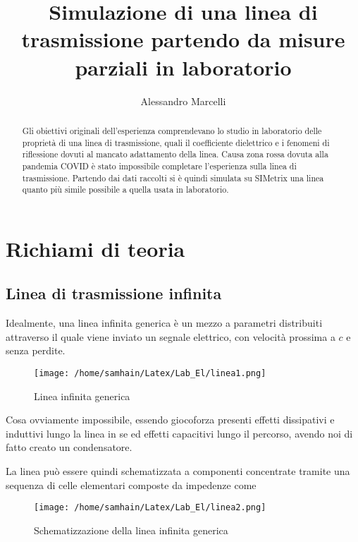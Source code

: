 \documentclass[]{report}
\title{Simulazione di una linea di trasmissione partendo da misure parziali in laboratorio}
\author{Alessandro Marcelli}
\begin{document}
\maketitle

\begin{abstract}
Gli obiettivi originali dell'esperienza comprendevano lo studio in laboratorio delle proprietà di una linea di trasmissione, quali il coefficiente dielettrico e i fenomeni di riflessione dovuti al mancato adattamento della linea.
Causa zona rossa dovuta alla pandemia COVID è stato impossibile completare l'esperienza sulla linea di trasmissione. Partendo dai dati raccolti si è quindi simulata su SIMetrix una linea quanto più simile possibile a quella usata in laboratorio. 
\end{abstract}

\tableofcontents


\newpage

\section{Richiami di teoria}

\subsection{Linea di trasmissione infinita}
Idealmente, una linea infinita generica è un mezzo a parametri distribuiti attraverso il quale viene inviato un segnale elettrico, con velocità prossima a $c$ e senza perdite. 
\begin{figure}[!htb]
	\centering
	\texttt{[image: /home/samhain/Latex/Lab\_El/linea1.png]}
	\label{fig:largenenough}
	\caption{\label{lul} \small Linea infinita generica}
\end{figure}

Cosa ovviamente impossibile, essendo giocoforza presenti effetti dissipativi e induttivi lungo la linea in se ed effetti capacitivi lungo il percorso, avendo noi di fatto creato un condensatore. 


La linea può essere quindi schematizzata a componenti concentrate tramite una sequenza di celle elementari composte da impedenze come
\begin{figure}[!htb]
	\centering
	\texttt{[image: /home/samhain/Latex/Lab\_El/linea2.png]}
	\label{fig:largenenough}
	\caption{\label{kekw} \small Schematizzazione della linea infinita generica}
\end{figure}
\end{document}
